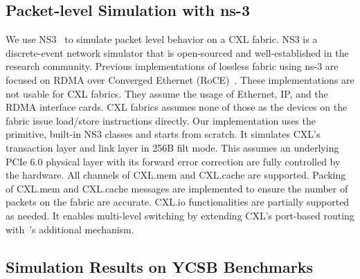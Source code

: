 \subsection{Packet-level Simulation with ns-3}
We use NS3~\cite{ns-3} to simulate packet level behavior on a CXL fabric.
%  
NS3 is a discrete-event network simulator that is open-sourced and well-established in the research community. 
%
Previous implementations of lossless fabric using ns-3 are focused on RDMA over Converged Ethernet (RoCE)~\cite{dcqcn:sigcomm:2015, hpcc:sigcomm:2019,pint:sigcomm:2020}.
%
These implementations are not usable for CXL fabrics. 
%
They assume the usage of Ethernet, IP, and the RDMA interface cards.
%
CXL fabrics assumes none of those as the devices on the fabric issue load/store instructions directly.  
%  
Our implementation uses the primitive, built-in NS3 classes and starts from scratch. 
%
It simulates CXL's transaction layer and link layer in 256B filt mode.
%
This assumes an underlying PCIe 6.0 physical layer with its forward error correction are fully controlled by the hardware.     
%
All channels of CXL.mem and CXL.cache are supported.
%
Packing of CXL.mem and CXL.cache messages are implemented to ensure the number of packets on the fabric are accurate.  
%
CXL.io functionalities are partially supported as needed.       
%
It enables multi-level switching by extending CXL's port-based routing with~\aurelia's additional mechanism.  

\subsection{Simulation Results on YCSB Benchmarks}

